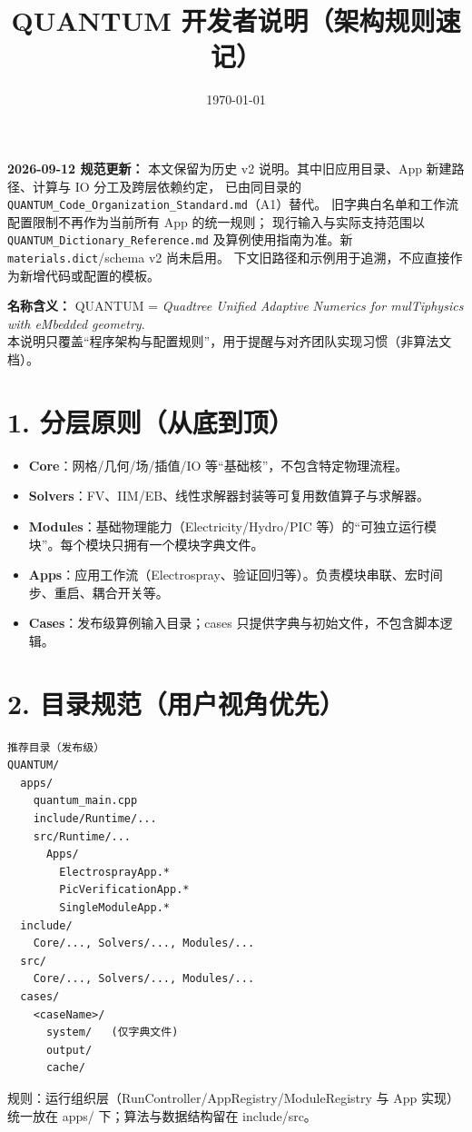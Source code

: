\documentclass[UTF8,a4paper,11pt]{ctexart}
\title{\bfseries QUANTUM 开发者说明（架构规则速记）}
\author{}
\date{\today}
\begin{document}
\maketitle

\noindent\textbf{2026-09-12 规范更新：}
本文保留为历史 v2 说明。其中旧应用目录、App 新建路径、计算与 IO 分工及跨层依赖约定，
已由同目录的 \texttt{QUANTUM\_Code\_Organization\_Standard.md}（A1）替代。
旧字典白名单和工作流配置限制不再作为当前所有 App 的统一规则；
现行输入与实际支持范围以 \texttt{QUANTUM\_Dictionary\_Reference.md}
及算例使用指南为准。新 \texttt{materials.dict}/schema v2 尚未启用。
下文旧路径和示例用于追溯，不应直接作为新增代码或配置的模板。\par\medskip

\noindent\textbf{名称含义：}
QUANTUM = \emph{Quadtree Unified Adaptive Numerics for mulTiphysics with eMbedded geometry}.\\
本说明只覆盖“程序架构与配置规则”，用于提醒与对齐团队实现习惯（非算法文档）。

\section*{1. 分层原则（从底到顶）}
\begin{itemize}
\item \textbf{Core}：网格/几何/场/插值/IO 等“基础核”，不包含特定物理流程。
\item \textbf{Solvers}：FV、IIM/EB、线性求解器封装等可复用数值算子与求解器。
\item \textbf{Modules}：基础物理能力（Electricity/Hydro/PIC 等）的“可独立运行模块”。每个模块只拥有一个模块字典文件。
\item \textbf{Apps}：应用工作流（Electrospray、验证回归等）。负责模块串联、宏时间步、重启、耦合开关等。
\item \textbf{Cases}：发布级算例输入目录；cases 只提供字典与初始文件，不包含脚本逻辑。
\end{itemize}

\section*{2. 目录规范（用户视角优先）}
\begin{lstlisting}
推荐目录（发布级）
QUANTUM/
  apps/
    quantum_main.cpp
    include/Runtime/...
    src/Runtime/...
      Apps/
        ElectrosprayApp.*
        PicVerificationApp.*
        SingleModuleApp.*
  include/
    Core/..., Solvers/..., Modules/...
  src/
    Core/..., Solvers/..., Modules/...
  cases/
    <caseName>/
      system/   (仅字典文件)
      output/
      cache/
\end{lstlisting}
规则：运行组织层（RunController/AppRegistry/ModuleRegistry 与 App 实现）统一放在 apps/ 下；算法与数据结构留在 include/src。
\end{document}
